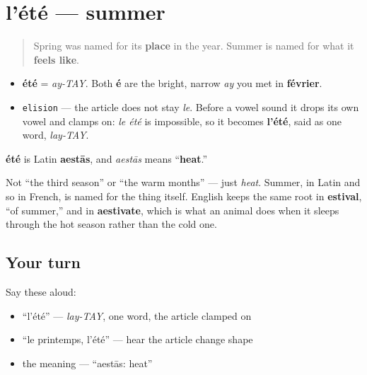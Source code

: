 \section[l'été]{l'été — summer}

\label{lesson:FR-C09-ete}



\begin{quote}
Spring was named for its \textbf{place} in the year. Summer is named for what it \textbf{feels like}.
\end{quote}

\begin{sounds}
\begin{itemize}
\raggedright
  \item \textbf{été} = \emph{ay-TAY}. Both \textbf{é} are the bright, narrow \emph{ay} you met in \textbf{février}.
  \item \texttt{elision} — the article does not stay \emph{le}. Before a vowel sound it drops its own vowel and clamps on: \emph{le été} is impossible, so it becomes \textbf{l'été}, said as one word, \emph{lay-TAY}.
\end{itemize}
\end{sounds}

\begin{cousinweb}
\textbf{été} is Latin \textbf{aestās}, and \emph{aestās} means \textquotedblleft{}\textbf{heat}.\textquotedblright{}

Not \textquotedblleft{}the third season\textquotedblright{} or \textquotedblleft{}the warm months\textquotedblright{} — just \emph{heat}. Summer, in Latin and so in French, is named for the thing itself. English keeps the same root in \textbf{estival}, \textquotedblleft{}of summer,\textquotedblright{} and in \textbf{aestivate}, which is what an animal does when it sleeps through the hot season rather than the cold one.
\end{cousinweb}

\subsection*{Your turn}
Say these aloud:

\begin{itemize}
\raggedright
  \item \textquotedblleft{}l'été\textquotedblright{} — \emph{lay-TAY}, one word, the article clamped on
  \item \textquotedblleft{}le printemps, l'été\textquotedblright{} — hear the article change shape
  \item the meaning — \textquotedblleft{}aestās: heat\textquotedblright{}
\end{itemize}

